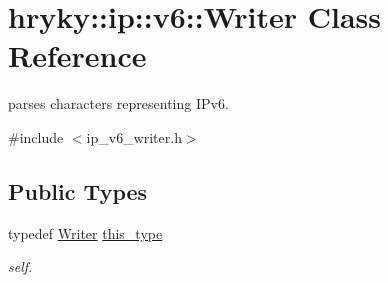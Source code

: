 \hypertarget{classhryky_1_1ip_1_1v6_1_1_writer}{\section{hryky\-:\-:ip\-:\-:v6\-:\-:Writer Class Reference}
\label{classhryky_1_1ip_1_1v6_1_1_writer}
}


parses characters representing I\-Pv6.  




{\ttfamily \#include $<$ip\-\_\-v6\-\_\-writer.\-h$>$}

\subsection*{Public Types}
\begin{DoxyCompactItemize}
\item 
\hypertarget{classhryky_1_1ip_1_1v6_1_1_writer_ab87fa5857b896ccb6e80da83edd48c32}{typedef \hyperlink{classhryky_1_1ip_1_1v6_1_1_writer}{Writer} \hyperlink{classhryky_1_1ip_1_1v6_1_1_writer_ab87fa5857b896ccb6e80da83edd48c32}{this\-\_\-type}}\label{classhryky_1_1ip_1_1v6_1_1_writer_ab87fa5857b896ccb6e80da83edd48c32}

\begin{DoxyCompactList}\small\item\em self. \end{DoxyCompactList}\end{DoxyCompactItemize}
